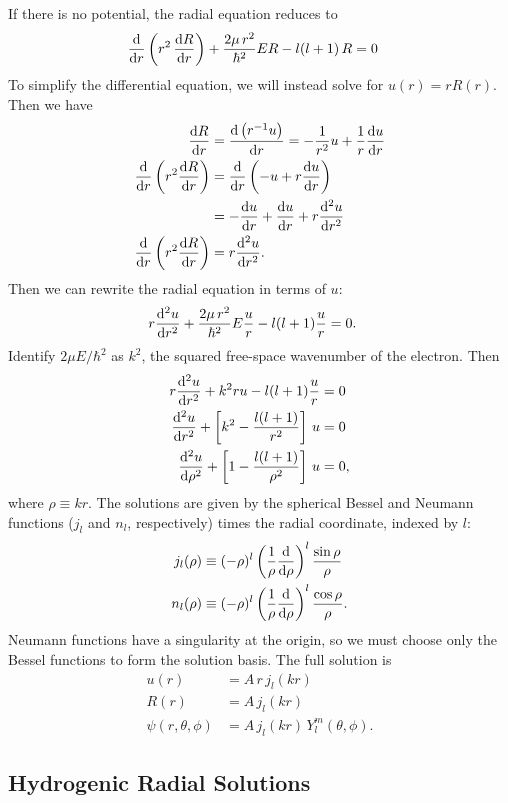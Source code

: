\documentclass[12pt]{article}
\numberwithin{equation}{section}
\begin{document}
If there is no potential, the radial equation reduces to
\begin{align*}
\dv{r} \left(r^2 \, \dv{R}{r}\right) + \frac{2\mu \, r^2}{\hbar^2} E R - l(l+1) \, R &= 0
\end{align*}
To simplify the differential equation, we will instead solve for $u(r) = r R(r)$. Then we have
\begin{align*}
\dv{R}{r} &= \dv{\left(r^{-1} u\right)}{r} = -\frac{1}{r^2} u + \frac{1}{r} \dv{u}{r} \\
\dv{r} \left(r^2 \dv{R}{r}\right) &= \dv{r} \left(-u + r \dv{u}{r}\right) \\
&= - \dv{u}{r} + \dv{u}{r} + r \dv[2]{u}{r} \\
\dv{r} \left(r^2 \dv{R}{r}\right) &= r \dv[2]{u}{r}.
\end{align*}
Then we can rewrite the radial equation in terms of $u$:
\begin{align*}
r \dv[2]{u}{r} + \frac{2\mu \, r^2}{\hbar^2} E \frac{u}{r} - l(l+1) \frac{u}{r} &= 0.
\end{align*}
Identify $2 \mu E/\hbar^2$ as $k^2$, the squared free-space wavenumber of the electron. Then
\begin{align*}
r \dv[2]{u}{r} + k^2 r u - l(l+1) \frac{u}{r} &= 0 \\
\dv[2]{u}{r} + \left[k^2 - \frac{l(l+1)}{r^2} \right] \, u &= 0 \\
\dv[2]{u}{\rho} + \left[1 - \frac{l(l+1)}{\rho^2} \right] \, u &= 0,
\end{align*}
where $\rho \equiv kr$. The solutions are given by the spherical Bessel and Neumann functions ($j_l$ and $n_l$, respectively) times the radial coordinate, indexed by $l$:
\begin{align*}
j_l(\rho) &\equiv (-\rho)^l \left(\frac{1}{\rho} \dv{\rho}\right)^l \frac{\sin \rho}{\rho} \\
n_l(\rho) &\equiv (-\rho)^l \left(\frac{1}{\rho} \dv{\rho}\right)^l \frac{\cos \rho}{\rho}.
\end{align*}
Neumann functions have a singularity at the origin, so we must choose only the Bessel functions to form the solution basis. The full solution is
\begin{align*}
u(r) &= A \, r \, j_l(kr) \\
R(r) &= A \, j_l(kr) \\
\psi(r, \theta, \phi) &= A \, j_l(kr) \, Y_l^m\left(\theta, \phi \right).
\end{align*}

\subsection{Hydrogenic Radial Solutions}
\end{document}
